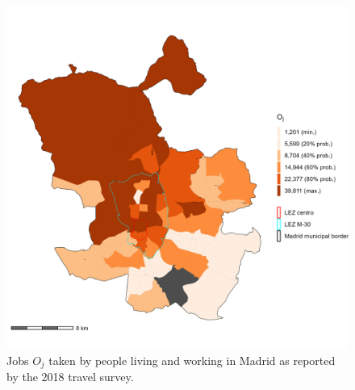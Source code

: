 \documentclass[]{trbunofficial}
\begin{document}
\begin{figure}

{\centering \includegraphics[width=1\linewidth]{images/i_jobs_zn208_plot} 

}

\caption{\label{fig:Fig2} Jobs $O_j$ taken by people living and working in Madrid as reported by the 2018 travel survey.}\label{fig:jobs-plot}
\end{figure}
\end{document}
